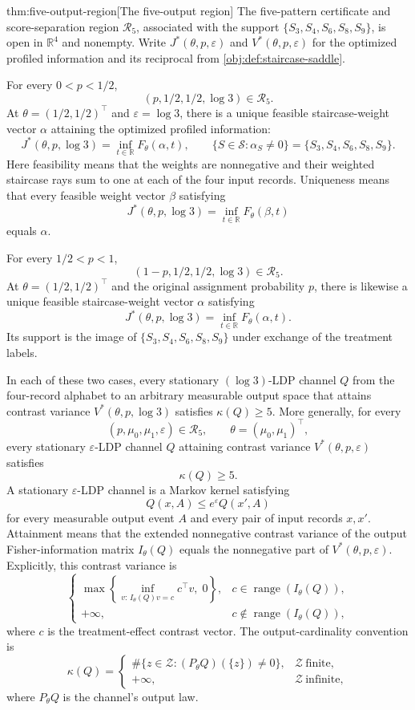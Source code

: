 \begin{theoremv}{thm:five-output-region}[The five-output region]
The five-pattern certificate and score-separation region \(\mathcal R_5\), associated with the support \(\{S_3,S_4,S_6,S_8,S_9\}\), is open in \(\mathbb R^4\) and nonempty. Write \(J^*(\theta,p,\varepsilon)\) and \(V^*(\theta,p,\varepsilon)\) for the optimized profiled information and its reciprocal from \cref{obj:def:staircase-saddle}.

For every \(0<p<1/2\),
\[
(p,1/2,1/2,\log 3)\in\mathcal R_5.
\]
At \(\theta=(1/2,1/2)^\top\) and \(\varepsilon=\log 3\), there is a unique feasible staircase-weight vector \(\alpha\) attaining the optimized profiled information:
\[
J^*(\theta,p,\log 3)
=
\inf_{t\in\mathbb R}F_\theta(\alpha,t),
\qquad
\{S\in\mathcal S:\alpha_S\ne0\}
=
\{S_3,S_4,S_6,S_8,S_9\}.
\]
Here feasibility means that the weights are nonnegative and their weighted staircase rays sum to one at each of the four input records. Uniqueness means that every feasible weight vector \(\beta\) satisfying
\[
J^*(\theta,p,\log 3)
=
\inf_{t\in\mathbb R}F_\theta(\beta,t)
\]
equals \(\alpha\).

For every \(1/2<p<1\),
\[
(1-p,1/2,1/2,\log 3)\in\mathcal R_5.
\]
At \(\theta=(1/2,1/2)^\top\) and the original assignment probability \(p\), there is likewise a unique feasible staircase-weight vector \(\alpha\) satisfying
\[
J^*(\theta,p,\log 3)
=
\inf_{t\in\mathbb R}F_\theta(\alpha,t).
\]
Its support is the image of \(\{S_3,S_4,S_6,S_8,S_9\}\) under exchange of the treatment labels.

In each of these two cases, every stationary \((\log 3)\)-LDP channel \(Q\) from the four-record alphabet to an arbitrary measurable output space that attains contrast variance \(V^*(\theta,p,\log 3)\) satisfies \(\kappa(Q)\ge5\). More generally, for every
\[
(p,\mu_0,\mu_1,\varepsilon)\in\mathcal R_5,
\qquad
\theta=(\mu_0,\mu_1)^\top,
\]
every stationary \(\varepsilon\)-LDP channel \(Q\) attaining contrast variance \(V^*(\theta,p,\varepsilon)\) satisfies
\[
\kappa(Q)\ge5.
\]
A stationary \(\varepsilon\)-LDP channel is a Markov kernel satisfying
\[
Q(x,A)\le e^\varepsilon Q(x',A)
\]
for every measurable output event \(A\) and every pair of input records \(x,x'\). Attainment means that the extended nonnegative contrast variance of the output Fisher-information matrix \(I_\theta(Q)\) equals the nonnegative part of \(V^*(\theta,p,\varepsilon)\). Explicitly, this contrast variance is
\[
\begin{cases}
\displaystyle
\max\!\left\{
\inf_{v:\,I_\theta(Q)v=c}c^\top v,\;0
\right\},
& c\in\operatorname{range}(I_\theta(Q)),\\[4pt]
+\infty,
& c\notin\operatorname{range}(I_\theta(Q)),
\end{cases}
\]
where \(c\) is the treatment-effect contrast vector. The output-cardinality convention is
\[
\kappa(Q)=
\begin{cases}
\#\{z\in\mathcal Z:(P_\theta Q)(\{z\})\ne0\},
& \mathcal Z\ \text{finite},\\
+\infty,
& \mathcal Z\ \text{infinite},
\end{cases}
\]
where \(P_\theta Q\) is the channel's output law.
\end{theoremv}

